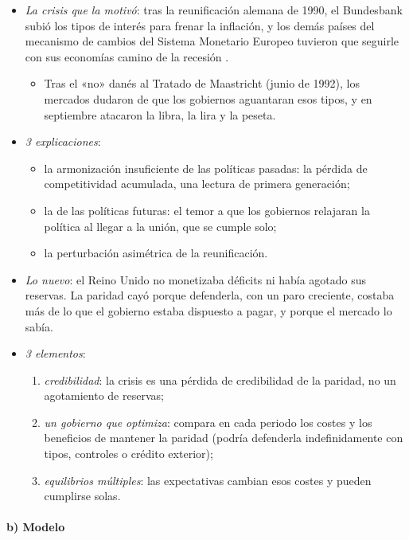 \documentclass[11pt]{article}
\begin{document}
\begin{itemize}
\item \emph{La crisis que la motivó}: tras la reunificación alemana de 1990, el Bundesbank subió los tipos de interés para frenar la inflación, y los demás países del mecanismo de cambios del Sistema Monetario Europeo tuvieron que seguirle con sus economías camino de la recesión\nocite{EichengreenWyplosz1993Unstable} .
  \begin{itemize}
  \item Tras el «no» danés al Tratado de Maastricht (junio de 1992), los mercados dudaron de que los gobiernos aguantaran esos tipos, y en septiembre atacaron la libra, la lira y la peseta.
  \end{itemize}
\item \emph{3 explicaciones}\nocite{EichengreenWyplosz1993Unstable}:
  \begin{itemize}
  \item la armonización insuficiente de las políticas pasadas: la pérdida de competitividad acumulada, una lectura de primera generación;
  \item la de las políticas futuras: el temor a que los gobiernos relajaran la política al llegar a la unión, que se cumple solo;
  \item la perturbación asimétrica de la reunificación.
  \end{itemize}
\item \emph{Lo nuevo}: el Reino Unido no monetizaba déficits ni había agotado sus reservas. La paridad cayó porque defenderla, con un paro creciente, costaba más de lo que el gobierno estaba dispuesto a pagar, y porque el mercado lo sabía.
\item \emph{3 elementos}:
  \begin{enumerate}
  \item \emph{credibilidad}: la crisis es una pérdida de credibilidad de la paridad, no un agotamiento de reservas;
  \item \emph{un gobierno que optimiza}: compara en cada periodo los costes y los beneficios de mantener la paridad (podría defenderla indefinidamente con tipos, controles o crédito exterior);
  \item \emph{equilibrios múltiples}: las expectativas cambian esos costes y pueden cumplirse solas.
  \end{enumerate}
\end{itemize}

\paragraph{b) Modelo}
\end{document}

